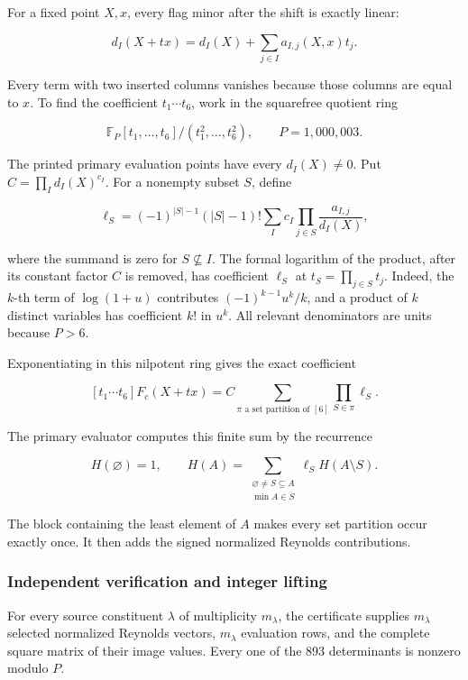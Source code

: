 \documentclass[
  10pt,
]{article}
\begin{document}
For a fixed point \(X,x\), every flag minor after the shift is exactly
linear:

\[
 d_I(X+t x)=d_I(X)+\sum_{j\in I}a_{I,j}(X,x)t_j.
\]

Every term with two inserted columns vanishes because those columns are
equal to \(x\). To find the coefficient \(t_1\cdots t_6\), work in the
squarefree quotient ring

\[
 \mathbb F_P[t_1,\ldots,t_6]/(t_1^2,\ldots,t_6^2),
 \qquad P=1,000,003.
\]

The printed primary evaluation points have every \(d_I(X)\ne0\). Put
\(C=\prod_Id_I(X)^{c_I}\). For a nonempty subset \(S\), define

\[
 \ell_S=(-1)^{|S|-1}(|S|-1)!
       \sum_I c_I\prod_{j\in S}\frac{a_{I,j}}{d_I(X)},
\]

where the summand is zero for \(S\not\subseteq I\). The formal logarithm
of the product, after its constant factor \(C\) is removed, has
coefficient \(\ell_S\) at \(t_S=\prod_{j\in S}t_j\). Indeed, the
\(k\)-th term of \(\log(1+u)\) contributes \((-1)^{k-1}u^k/k\), and a
product of \(k\) distinct variables has coefficient \(k!\) in \(u^k\).
All relevant denominators are units because \(P>6\).

Exponentiating in this nilpotent ring gives the exact coefficient

\[
 [t_1\cdots t_6]F_c(X+t x)
 =C\sum_{\pi\text{ a set partition of }[6]}
          \prod_{S\in\pi}\ell_S.
\]

The primary evaluator computes this finite sum by the recurrence

\[
 H(\varnothing)=1,\qquad
 H(A)=\sum_{\substack{\varnothing\ne S\subseteq A\\\min A\in S}}
             \ell_SH(A\setminus S).
\]

The block containing the least element of \(A\) makes every set
partition occur exactly once. It then adds the signed normalized
Reynolds contributions.

\subsubsection{Independent verification and integer
lifting}\label{independent-verification-and-integer-lifting}

For every source constituent \(\lambda\) of multiplicity \(m_\lambda\),
the certificate supplies \(m_\lambda\) selected normalized Reynolds
vectors, \(m_\lambda\) evaluation rows, and the complete square matrix
of their image values. Every one of the 893 determinants is nonzero
modulo \(P\).
\end{document}
